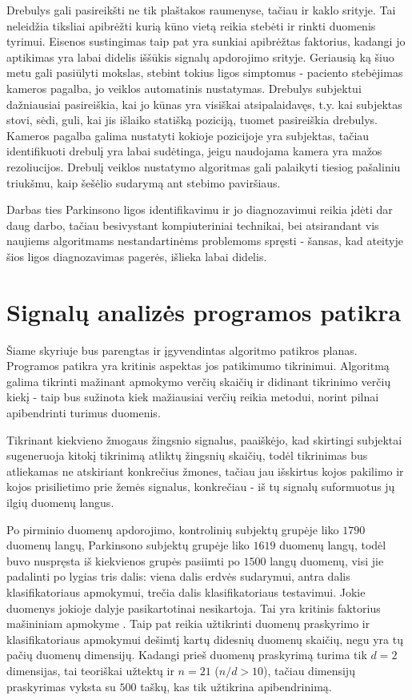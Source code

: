\documentclass[]{vgtuef}
\begin{document}
Drebulys gali pasireikšti ne tik plaštakos raumenyse, tačiau ir kaklo srityje. Tai neleidžia tiksliai apibrėžti kurią kūno vietą reikia stebėti ir rinkti duomenis tyrimui. Eisenos sustingimas taip pat yra sunkiai apibrėžtas faktorius, kadangi jo aptikimas yra labai didelis iššūkis signalų apdorojimo srityje. Geriausią ką šiuo metu gali pasiūlyti mokslas, stebint tokius ligos simptomus - paciento stebėjimas kameros pagalba, jo veiklos automatinis nustatymas. Drebulys subjektui dažniausiai pasireiškia, kai jo kūnas yra visiškai atsipalaidavęs, t.y. kai subjektas stovi, sėdi, guli, kai jis išlaiko statišką poziciją, tuomet pasireiškia drebulys. Kameros pagalba galima nustatyti kokioje pozicijoje yra subjektas, tačiau identifikuoti drebulį yra labai sudėtinga, jeigu naudojama kamera yra mažos rezoliucijos. Drebulį veiklos nustatymo algoritmas gali palaikyti tiesiog pašaliniu triukšmu, kaip šešėlio sudarymą ant stebimo paviršiaus. 

Darbas ties Parkinsono ligos identifikavimu ir jo diagnozavimui reikia įdėti dar daug darbo, tačiau besivystant kompiuteriniai technikai, bei atsirandant vis naujiems algoritmams nestandartinėms problemoms spręsti - šansas, kad ateityje šios ligos diagnozavimas pagerės, išlieka labai didelis.

\section{Signalų analizės programos patikra}

Šiame skyriuje bus parengtas ir įgyvendintas algoritmo patikros planas. Programos patikra yra kritinis aspektas jos patikimumo tikrinimui. Algoritmą galima tikrinti mažinant apmokymo verčių skaičių ir didinant tikrinimo verčių kiekį - taip bus sužinota kiek mažiausiai verčių reikia metodui, norint pilnai apibendrinti turimus duomenis.

Tikrinant kiekvieno žmogaus žingsnio signalus, paaiškėjo, kad skirtingi subjektai sugeneruoja kitokį tikrinimą atliktų žingsnių skaičių, todėl tikrinimas bus atliekamas ne atskiriant konkrečius žmones, tačiau jau išskirtus kojos pakilimo ir kojos prisilietimo prie žemės signalus, konkrečiau - iš tų signalų suformuotus jų ilgių duomenų langus.

Po pirminio duomenų apdorojimo, kontrolinių subjektų grupėje liko $1790$ duomenų langų, Parkinsono subjektų grupėje liko $1619$ duomenų langų, todėl buvo nuspręsta iš kiekvienos grupės pasiimti po $1500$ langų duomenų, visi jie padalinti po lygias tris dalis: viena dalis erdvės sudarymui, antra dalis klasifikatoriaus apmokymui, trečia dalis klasifikatoriaus testavimui. Jokie duomenys jokioje dalyje pasikartotinai nesikartoja. Tai yra kritinis faktorius mašininiam apmokyme \cite{824819}. Taip pat reikia užtikrinti duomenų praskyrimo ir klasifikatoriaus apmokymui dešimtį kartų didesnių duomenų skaičių, negu yra tų pačių duomenų dimensijų. Kadangi prieš duomenų praskyrimą turima tik $d=2$ dimensijas, tai teoriškai užtektų ir $n=21$ ($n/d > 10$), tačiau dimensijų praskyrimas vyksta su $500$ taškų, kas tik užtikrina apibendrinimą. 
\end{document}
